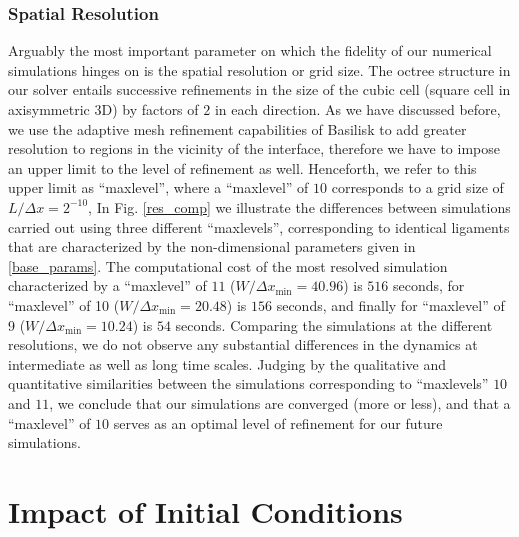 \subsubsection*{Spatial Resolution}

Arguably the most important parameter on which the fidelity of our
numerical simulations hinges on is the spatial resolution or grid size. 
The octree structure in our solver entails successive refinements in the  
size of the cubic cell (square cell in axisymmetric 3D) by factors of $2$ in each direction.
As we have discussed before, we use the adaptive mesh refinement capabilities 
of Basilisk to add greater resolution to regions in the vicinity of the interface, 
therefore we have to impose an upper limit to the level of refinement as well. 
Henceforth, we refer to this upper limit as ``maxlevel'', 
where a ``maxlevel'' of $10$ corresponds to a grid size of $L/ \Delta x = 2^{-10}$,  
In Fig. \ref{res_comp} we illustrate the differences between simulations carried out
using three different ``maxlevels'', corresponding to identical ligaments that
are characterized by the non-dimensional parameters given in \eqref{base_params}.
The computational cost of the most resolved simulation characterized by a ``maxlevel''
of $11$ ($W / \Delta x_{\textrm{min}} = 40.96$) is $516$ seconds, 
for ``maxlevel'' of 10 ($W / \Delta x_{\textrm{min}} = 20.48$) is $156$ seconds, and finally 
for ``maxlevel'' of 9 ($W / \Delta x_{\textrm{min}} = 10.24$) is $54$ seconds. 
Comparing the simulations at the different resolutions, we do not observe any substantial 
differences in the dynamics at intermediate as well as long time scales.
Judging by the qualitative and quantitative similarities between the simulations corresponding 
to ``maxlevels'' $10$ and $11$, we conclude that our simulations are converged (more or less),
and that a ``maxlevel'' of $10$ serves as an optimal level of refinement for our future simulations.  


\section{Impact of Initial Conditions}

